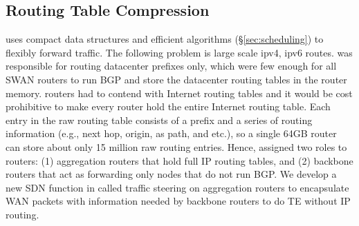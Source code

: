 \subsection{Routing Table Compression}
{\sys} uses compact data structures and efficient algorithms (\S \ref{sec:scheduling}) to flexibly forward traffic. The following problem is large scale ipv4, ipv6 routes. {\sys} was responsible for routing datacenter prefixes only, which were few enough for all SWAN routers to run BGP and store the datacenter routing tables in the router memory. {\sys} routers had to contend with Internet routing tables and it would be cost prohibitive to make every {\sys} router hold the entire Internet routing table.  Each entry in the raw routing table consists of a prefix and a series of routing information (e.g., next hop, origin, as path, and etc.), so a single 64GB router can store about only 15 million raw routing entries. Hence, {\sys} assigned two roles to routers: (1) aggregation routers that hold full IP routing tables, and (2) backbone routers that act as forwarding only nodes that do not run BGP. We develop a new SDN function in {\sys} called traffic steering on aggregation routers to encapsulate WAN packets with information needed by backbone routers to do TE without IP routing. 

